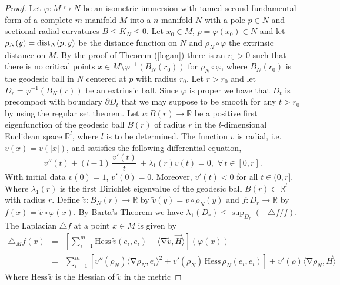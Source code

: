 \documentclass[a4paper]{amsart}
\theoremstyle{definition}
\numberwithin{equation}{section}
\begin{document}
\begin{proof}

 \noindent Let $\varphi: M \hookrightarrow  N$ be an isometric
immersion with tamed second fundamental form of a complete $m$-manifold $M$ into a $n$-manifold $N$   with a pole $p\in N$ and sectional radial curvatures $B\leq K_{N}\leq 0$.
Let $x_{0}\in M$, $p=\varphi(x_{0})\in N$ and let $\rho_{N} (y)={\rm dist}_{N}(p,y)$ be the
distance function on $N$ and $\rho_{N} \circ \varphi$ the extrinsic distance on $M$. By the proof of Theorem (\ref{logan}) there is an $r_{0}>0$ such that there is no critical points $x\in
M\setminus \varphi^{-1}(B_{N}(r_{0}))$ for $\rho_{N} \circ \varphi$, where
$B_{N}(r_{0})$ is the geodesic ball in $N$ centered at $p$ with radius $r_{0}$. Let $r >r_{0}$ and let $D_r =\varphi^{-1}(B_{N}(r))$ be an extrinsic ball. Since $\varphi $
is proper we have that $D_t$ is precompact with boundary $\partial D_t$ that we may suppose to be smooth for any $t>r_0$ by using the regular set theorem. Let $v:B(r)\to \mathbb{R}$ be a positive first eigenfunction of the geodesic ball $B(r)$ of radius $r$ in the $l$-dimensional Euclidean space ${\mathbb{R}}^l$, where $l$ is to be determined. The function $v$ is radial, i.e. $v(x)=v(\vert x\vert)$, and satisfies the following differential equation,
\begin{equation}v''(t)+(l-1)\,\frac{v'(t)}{t}\,
+\lambda_{1}(r)v(t)=0,
\,\, \forall\, t\in[0,r].\label{eqLambda-l}
\end{equation}
With initial data $v(0)=1$, $v'(0)=0$. Moreover, $v'(t)<0$ for all $t\in (0,r]$. Where $\lambda_{1}(r)$ is the first Dirichlet eigenvalue of the geodesic ball $B(r)\subset{\mathbb{R}}^l$ with radius $r$.
Define
$\tilde{v}:B_{N}(r)\to \mathbb{R}$ by $\tilde{v}(y)=v\circ\rho_{N}(y)$
 and $f:D_r \to \mathbb{R}$ by $f(x)=\tilde{v}\circ \varphi(x)$. By  Barta's Theorem we have
 $\lambda_{1}(D_r)\leq \sup_{D_r}(-\triangle f/f)$. The Laplacian $\triangle f$ at a point $x\in M$ is given by
 \begin{eqnarray}
 \triangle_{M} f(x)& =&[\displaystyle\sum_{i=1}^{m}{\textrm{Hess}}\, \tilde{v}(e_i,e_i)
 + \langle {\operatorname{\nabla}} \tilde{v},\vec H\rangle](\varphi(x))\nonumber \\
 &=&\displaystyle\sum_{i=1}^{m}\left[{v}''(\rho_{N}
 )\langle {\operatorname{\nabla}}\rho_{N}, e_{i}\rangle^{2} +v'( \rho_{N}
 )\,{\textrm{Hess}}\,\rho_{N} (e_i,e_i)\right]+ v'( \rho
 )\langle {\operatorname{\nabla}} \rho_{N},\vec H\rangle\nonumber
 \end{eqnarray}
 Where ${\textrm{Hess}}\,\tilde{v}$ is the Hessian of $\tilde{v}$ in the metric

\end{proof}
\end{document}
